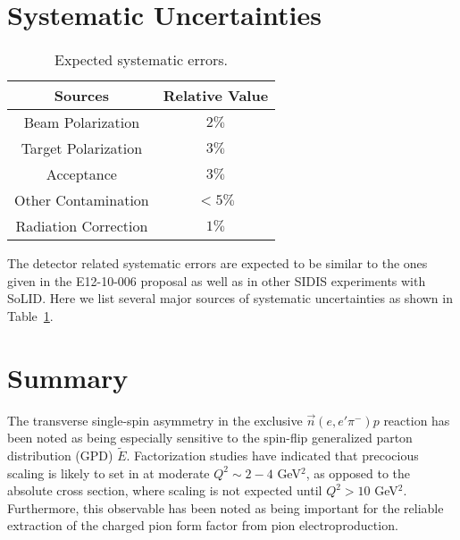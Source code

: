 \documentclass{article}
\begin{document}
\newpage


\newpage


\section{Systematic Uncertainties}
\begin{table}[!htp]
\centering
\begin{tabular}{|c|c|}
\hline
{\bf Sources}            & {\bf Relative Value} \\\hline
Beam Polarization        & $2\%$ \\\hline 
Target Polarization      & $3\%$ \\\hline 
Acceptance               & $3\%$ \\\hline
Other Contamination      & $<5\%$ \\\hline
Radiation Correction     & $1\%$ \\\hline
\end{tabular}
\caption{\footnotesize{Expected systematic errors.}}\label{table:det_sys_err}
\end{table}
The detector related systematic errors are expected to be similar to the ones
given in the E12-10-006 proposal as well as in other SIDIS experiments with
SoLID. Here we list several major sources of systematic uncertainties as shown
in Table~\ref{table:det_sys_err}.

\section{Summary}
The transverse single-spin asymmetry in the exclusive $\vec{n}(e,e'\pi^-)p$
reaction has been noted as being
especially sensitive to the spin-flip generalized parton distribution (GPD)
$\tilde{E}$.  Factorization studies have indicated that precocious scaling
is likely to set in at moderate $Q^2\sim 2-4$ GeV$^2$, as opposed to the
absolute cross section, where scaling is not expected until $Q^2>10$ GeV$^2$.
Furthermore, this observable has been noted as being important for the reliable
extraction of the charged pion form factor from pion electroproduction.
\end{document}
